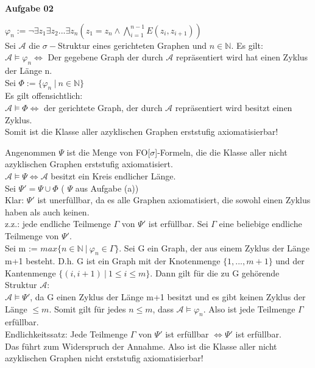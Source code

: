 \documentclass[a4paper,10pt]{article}
\begin{document}
	\textbf{Aufgabe 02}
	\begin{compactenum} [(a)]
		\item $ \varphi_n := \lnot \exists z_1 \exists z_2 ... \exists z_n (z_1 = z_n \wedge \bigwedge\limits_{i = 1}^{n-1} E(z_i, z_{i+1}))$\\
		Sei $ \mathcal{A} $ die $ \sigma-$Struktur eines gerichteten Graphen und $ n \in \mathbb{N} $. Es gilt:\\
		$ \mathcal{A} \models \varphi_n \Longleftrightarrow $ Der gegebene Graph der durch $ \mathcal{A} $ repräsentiert wird hat einen Zyklus der Länge n.\\
		Sei $ \Phi := \{\varphi_n\ |\ n \in \mathbb{N} \} $\\
		Es gilt offensichtlich: \\
		$ \mathcal{A} \models \Phi \Longleftrightarrow $ der gerichtete Graph, der durch $ \mathcal{A} $ repräsentiert wird besitzt einen Zyklus.\\
		Somit ist die Klasse aller azyklischen Graphen erststufig axiomatisierbar!
		
		\item Angenommen $ \Psi $ ist die Menge von FO[$ \sigma $]-Formeln, die die Klasse aller nicht azyklischen Graphen erststufig axiomatisiert.\\
		$ \mathcal{A} \models \Psi \Longleftrightarrow \mathcal{A} $ besitzt ein Kreis endlicher Länge. \\
		Sei $ \Psi'  = \Psi \cup \Phi $ ( $ \Psi $ aus Aufgabe (a)) \\
		Klar: $ \Psi' $ ist unerfüllbar, da es alle Graphen axiomatisiert, die sowohl einen Zyklus haben als auch keinen.\\
		z.z.: jede endliche Teilmenge $ \Gamma $ von $ \Psi' $ ist erfüllbar. Sei $ \Gamma $ eine beliebige endliche Teilmenge von $ \Psi' $. \\
		Sei m := $ max \{n \in \mathbb{N}\ |\ \varphi_n \in \Gamma \}$. Sei G ein Graph, der aus einem Zyklus der Länge m+1 besteht. D.h. G ist ein Graph mit der Knotenmenge $ \{1,...,m+1\} $ und der Kantenmenge $ \{(i, i+1)\ |\ 1\leq i \leq m \} $. Dann gilt für die zu G gehörende Struktur $ \mathcal{A} $:\\
		$ \mathcal{A} \models \Psi' $, da G einen Zyklus der Länge m+1 besitzt und es gibt keinen Zyklus der Länge $ \leq m $. Somit gilt für jedes $ n \leq m $, dass $ \mathcal{A} \models \varphi_n $. Also ist jede Teilmenge $ \Gamma $ erfüllbar. \\
		Endlichkeitssatz: Jede Teilmenge $ \Gamma $ von $ \Psi' $ ist erfüllbar $ \Longleftrightarrow \Psi' $ ist erfüllbar.\\
		Das führt zum Widerspruch der Annahme. Also ist die Klasse aller nicht azyklischen Graphen nicht erststufig axiomatisierbar!
	\end{compactenum}\
	
\end{document}
